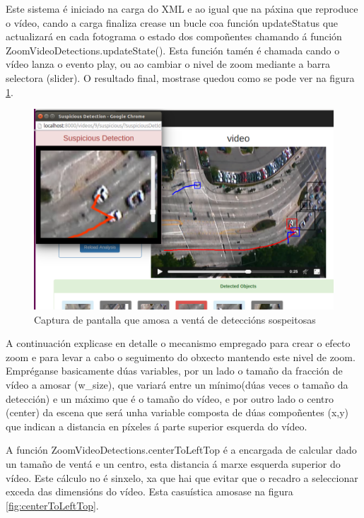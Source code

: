         Este sistema é iniciado na carga do XML e ao igual que na páxina que reproduce o vídeo, cando a 
        carga finaliza crease
        un bucle coa función updateStatus que actualizará en cada fotograma o estado dos compoñentes 
        chamando á función ZoomVideoDetections.updateState(). Esta función tamén é chamada cando o vídeo
        lanza o evento play, ou ao cambiar o nivel de zoom mediante a barra selectora (slider).
        O resultado final, mostrase quedou como se pode ver na figura \ref{fig:suspiciousPopupCapture}.

        \begin{figure}[htp]
        \begin{center}
            \includegraphics[scale=0.4]{figures/suspiciousPopupCapture.png}
            \caption{Captura de pantalla que amosa a ventá de deteccións sospeitosas}
        \label{fig:suspiciousPopupCapture}
        \end{center}
        \end{figure} 
        
        A continuación explicase en detalle o mecanismo empregado para crear o efecto zoom e para 
        levar a cabo o seguimento do obxecto mantendo este nivel de zoom. Empréganse 
        basicamente dúas variables, por un lado o tamaño da fracción de vídeo a amosar (w\_size), que
        variará entre un mínimo(dúas veces o tamaño da detección) e un máximo que é o tamaño do vídeo, 
        e por outro lado o centro (center) da escena que será unha variable composta de dúas 
        compoñentes (x,y) que indican a distancia en píxeles á parte superior esquerda do vídeo.
        
        A función ZoomVideoDetections.centerToLeftTop é a encargada de calcular dado un tamaño de ventá 
        e un centro, esta distancia á marxe esquerda superior do vídeo. Este cálculo no é sinxelo, xa que 
        hai que evitar que o recadro a seleccionar exceda das dimensións do vídeo. Esta casuística 
        amosase na figura \ref{fig:centerToLeftTop}.
        

